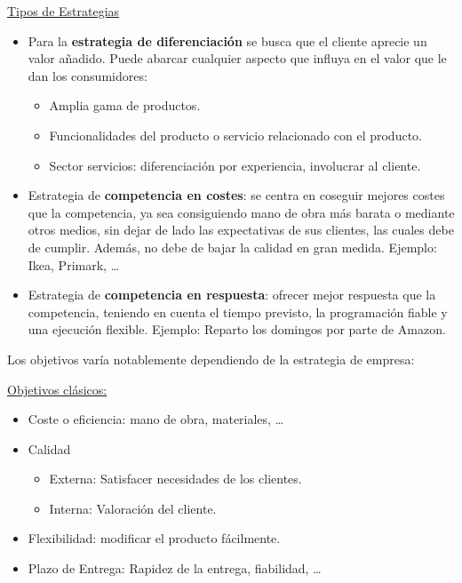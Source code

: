 \documentclass[12pt]{book} %
\providecommand{\tightlist}{%
  \setlength{\itemsep}{0pt}\setlength{\parskip}{0pt}}
\begin{document}
\underline{Tipos de Estrategias}

\begin{itemize}
\tightlist
\item
  Para la \textbf{estrategia de diferenciación} se busca que el cliente
  aprecie un valor añadido. Puede abarcar cualquier aspecto que influya
  en el valor que le dan los consumidores:

  \begin{itemize}
  \tightlist
  \item
    Amplia gama de productos.\\
  \item
    Funcionalidades del producto o servicio relacionado con el
    producto.\\
  \item
    Sector servicios: diferenciación por experiencia, involucrar al
    cliente.
  \end{itemize}
\item
  Estrategia de \textbf{competencia en costes}: se centra en coseguir
  mejores costes que la competencia, ya sea consiguiendo mano de obra
  más barata o mediante otros medios, sin dejar de lado las expectativas
  de sus clientes, las cuales debe de cumplir. Además, no debe de bajar
  la calidad en gran medida. Ejemplo: Ikea, Primark, \ldots{}\\
\item
  Estrategia de \textbf{competencia en respuesta}: ofrecer mejor
  respuesta que la competencia, teniendo en cuenta el tiempo previsto,
  la programación fiable y una ejecución flexible. Ejemplo: Reparto los
  domingos por parte de Amazon.
\end{itemize}

Los objetivos varía notablemente dependiendo de la estrategia de
empresa:

\underline{Objetivos clásicos:}

\begin{itemize}
\tightlist
\item
  Coste o eficiencia: mano de obra, materiales, \ldots{}
\item
  Calidad

  \begin{itemize}
  \tightlist
  \item
    Externa: Satisfacer necesidades de los clientes.
  \item
    Interna: Valoración del cliente.
  \end{itemize}
\item
  Flexibilidad: modificar el producto fácilmente.
\item
  Plazo de Entrega: Rapidez de la entrega, fiabilidad, \ldots{}
\end{itemize}
\end{document}
